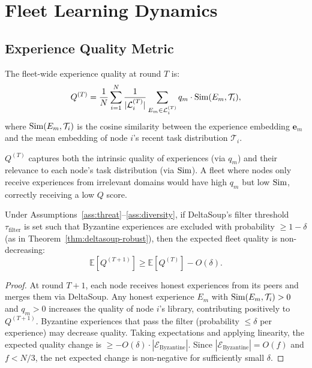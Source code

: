 \section{Fleet Learning Dynamics}

\label{sec:convergence}

\subsection{Experience Quality Metric}

\begin{definition}
\label{def:quality-metric}
The fleet-wide experience quality at round $T$ is:
\begin{equation}
    Q^{(T)} = \frac{1}{N} \sum_{i=1}^{N} \frac{1}{|\mathcal{L}_i^{(T)}|}
    \sum_{E_m \in \mathcal{L}_i^{(T)}} q_m \cdot \operatorname{Sim}(E_m, \mathcal{T}_i),
    \label{eq:fleet-quality}
\end{equation}
where $\operatorname{Sim}(E_m, \mathcal{T}_i)$ is the cosine similarity between the
experience embedding $\bm{e}_m$ and the mean embedding of node $i$'s
recent task distribution $\mathcal{T}_i$.
\end{definition}

$Q^{(T)}$ captures both the intrinsic quality of experiences (via $q_m$) and
their relevance to each node's task distribution (via $\operatorname{Sim}$). A fleet where
nodes only receive experiences from irrelevant domains would have high $q_m$
but low $\operatorname{Sim}$, correctly receiving a low $Q$ score.

\begin{theorem}
\label{thm:monotone}
Under Assumptions~\ref{ass:threat}--\ref{ass:diversity}, if DeltaSoup's
filter threshold $\tau_{\text{filter}}$ is set such that Byzantine experiences
are excluded with probability $\geq 1 - \delta$ (as in
Theorem~\ref{thm:deltasoup-robust}), then the expected fleet quality is
non-decreasing:
\begin{equation}
    \mathbb{E}\left[Q^{(T+1)}\right] \geq \mathbb{E}\left[Q^{(T)}\right]
    - O(\delta).
    \label{eq:monotone}
\end{equation}
\end{theorem}

\begin{proof}
At round $T+1$, each node receives honest experiences from its peers and
merges them via DeltaSoup. Any honest experience $E_m$ with $\operatorname{Sim}(E_m,
\mathcal{T}_i) > 0$ and $q_m > 0$ increases the quality of node $i$'s
library, contributing positively to $Q^{(T+1)}$. Byzantine experiences that
pass the filter (probability $\leq \delta$ per experience) may decrease
quality. Taking expectations and applying linearity, the expected quality
change is $\geq -O(\delta) \cdot |\mathcal{E}_{\text{Byzantine}}|$. Since
$|\mathcal{E}_{\text{Byzantine}}| = O(f)$ and $f < N/3$, the net expected
change is non-negative for sufficiently small $\delta$.
\end{proof}

